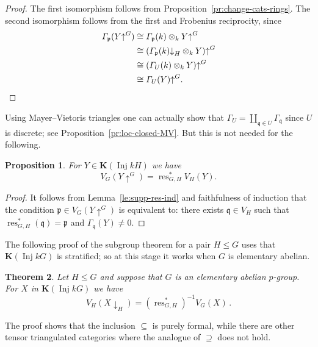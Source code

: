 \documentclass{amsart}[a4]
\newtheorem{theorem}{Theorem}[section]
\newtheorem{proposition}[theorem]{Proposition}
\theoremstyle{definition}
\theoremstyle{remark}
\numberwithin{equation}{section}
\newcommand{\Inj}{\operatorname{Inj}}
\newcommand{\res}{\operatorname{res}}
\newcommand{\da}{{\downarrow}}
\newcommand{\ua}{{\uparrow}}
\newcommand{\bfK}{\mathbf K}
\newcommand{\fp}{\mathfrak{p}}
\newcommand{\fq}{\mathfrak{q}}
\let\Gamma\varGamma
\begin{document}
\begin{proof}
 The first isomorphism follows from Proposition~\ref{pr:change-cats-rings}.
  The second isomorphism follows from the first and Frobenius
  reciprocity, since
  \begin{align*}
    \Gamma_\fp (Y\ua^G)&\cong \Gamma_\fp (k) \otimes_k Y\ua^G\\
                       &\cong(\Gamma_\fp (k)\da_H \otimes_k Y)\ua^G\\
                       &\cong(\Gamma_U (k) \otimes_k Y)\ua^G\\
&\cong\Gamma_U(Y)\ua^G.\qedhere
  \end{align*}
\end{proof}

Using Mayer--Vietoris triangles one can actually show that
$\Gamma_U=\coprod_{\fq\in U}\Gamma_\fq$ since $U$ is discrete; see
Proposition~\ref{pr:loc-closed-MV}. But this is not needed for the
following.

\begin{proposition}\label{pr:V-res-ind}
  For $Y\in \bfK(\Inj kH)$ we have
  \[V_G(Y\ua^G)=\res_{G,H}^* V_H(Y).\]
\end{proposition}
\begin{proof}
It follows from
  Lemma~\ref{le:supp-res-ind} and faithfulness of induction that the condition $\fp\in V_G(Y\ua^G)$
  is equivalent to: there exists $\fq\in V_H$ such that
  $\res^*_{G,H}(\fq) = \fp$ and $\Gamma_\fq(Y)\neq 0$.
\end{proof}


The following proof of the subgroup theorem for a pair $H\le G$ uses
that $\bfK(\Inj kG)$ is stratified; so at this stage it works when $G$
is elementary abelian.

\begin{theorem}
\label{th:subgroup}
Let $H\le G$ and suppose that $G$ is an elementary abelian $p$-group. For  $X$ in $\bfK(\Inj
kG)$ we have
\[ 
 V_{H}(X{\da_{H}})=(\res_{G,H}^*)^{-1} V_G(X)\,. 
\]
\end{theorem}

The proof shows that the inclusion $\subseteq$  is purely
formal, while there are other tensor triangulated categories  where the
analogue of $\supseteq$ does not hold.
\end{document}
